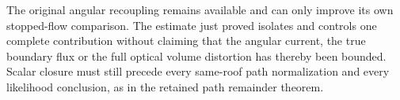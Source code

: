 The original angular recoupling remains available and can only
improve its own stopped-flow comparison. The estimate just proved
isolates and controls one complete contribution without claiming
that the angular current, the true boundary flux or the full optical
volume distortion has thereby been bounded. Scalar closure must
still precede every same-roof path normalization and every likelihood
conclusion, as in the retained path remainder theorem.
